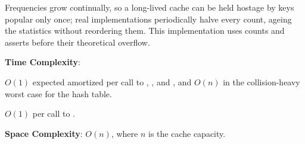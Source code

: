 Frequencies grow continually, so a long-lived cache can be held hostage by keys popular only once; real implementations periodically halve every count, ageing the statistics without reordering them. This implementation uses  counts and asserts before their theoretical overflow.

\textbf{Time Complexity}:
\begin{compactitem}
  \item $O(1)$ expected amortized per call to , , and , and $O(n)$ in the collision-heavy worst case for the hash table.
  \item $O(1)$ per call to .
\end{compactitem}

\textbf{Space Complexity}: $O(n)$, where $n$ is the cache capacity.

